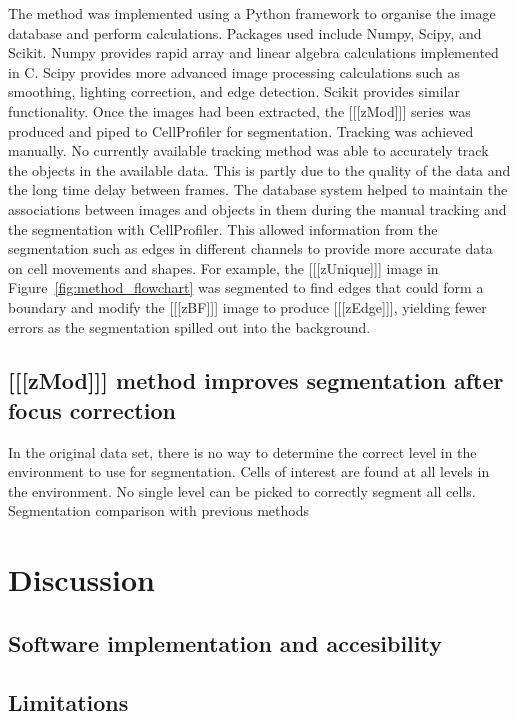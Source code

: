 \documentclass[preprint,11pt,5p,twocolumn]{elsarticle}
\begin{document}
The method was implemented using a Python framework to organise the image database and perform calculations. Packages used include Numpy, Scipy, and Scikit. Numpy provides rapid array and linear algebra calculations implemented in C. Scipy provides more advanced image processing calculations such as smoothing, lighting correction, and edge detection. Scikit provides similar functionality. Once the images had been extracted, the [[[zMod]]] series was produced and piped to CellProfiler for segmentation. Tracking was achieved manually. No currently available tracking method was able to accurately track the objects in the available data. This is partly due to the quality of the data and the long time delay between frames. The database system helped to maintain the associations between images and objects in them during the manual tracking and the segmentation with CellProfiler. This allowed information from the segmentation such as edges in different channels to provide more accurate data on cell movements and shapes. For example, the [[[zUnique]]] image in Figure~\ref{fig:method_flowchart} was segmented to find edges that could form a boundary and modify the [[[zBF]]] image to produce [[[zEdge]]], yielding fewer errors as the segmentation spilled out into the background.

\subsection{[[[zMod]]] method improves segmentation after focus correction}

In the original data set, there is no way to determine the correct level in the environment to use for segmentation. Cells of interest are found at all levels in the environment. No single level can be picked to correctly segment all cells.  Segmentation comparison with previous methods

\section{Discussion}

\subsection{Software implementation and accesibility}
\subsection{Limitations}

\end{document}
